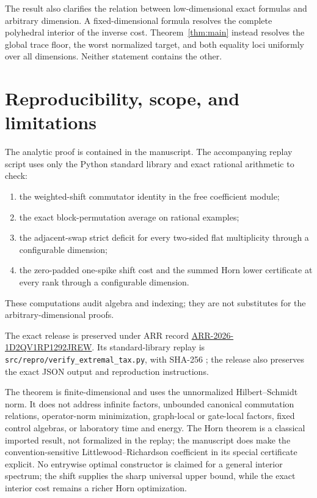 \documentclass[11pt]{article}
\theoremstyle{definition}
\theoremstyle{remark}
\newcommand{\1}{\mathbf 1}
\begin{document}
The result also clarifies the relation between low-dimensional exact formulas and arbitrary dimension.  A fixed-dimensional formula resolves the complete polyhedral interior of the inverse cost.  Theorem~\ref{thm:main} instead resolves the global trace floor, the worst normalized target, and both equality loci uniformly over all dimensions.  Neither statement contains the other.

\section{Reproducibility, scope, and limitations}

The analytic proof is contained in the manuscript.  The accompanying replay script uses only the Python standard library and exact rational arithmetic to check:
\begin{enumerate}[leftmargin=*]
 \item the weighted-shift commutator identity in the free coefficient module;
 \item the exact block-permutation average on rational examples;
 \item the adjacent-swap strict deficit for every two-sided flat multiplicity through a configurable dimension;
 \item the zero-padded one-spike shift cost and the summed Horn lower certificate at every rank through a configurable dimension.
\end{enumerate}
These computations audit algebra and indexing; they are not substitutes for the arbitrary-dimensional proofs.

The exact release is preserved under ARR record
\href{https://arr-research.github.io/papers/ARR-2026-1D2QV1RP1292JREW/}{ARR-2026-1D2QV1RP1292JREW}.
Its standard-library replay is \texttt{src/repro/verify\_extremal\_tax.py}, with
SHA-256
\texttt{};
the release also preserves the exact JSON output and reproduction instructions.

The theorem is finite-dimensional and uses the unnormalized Hilbert--Schmidt norm.  It does not address infinite factors, unbounded canonical commutation relations, operator-norm minimization, graph-local or gate-local factors, fixed control algebras, or laboratory time and energy.  The Horn theorem is a classical imported result, not formalized in the replay; the manuscript does make the convention-sensitive Littlewood--Richardson coefficient in its special certificate explicit.  No entrywise optimal constructor is claimed for a general interior spectrum; the shift supplies the sharp universal upper bound, while the exact interior cost remains a richer Horn optimization.
\end{document}
